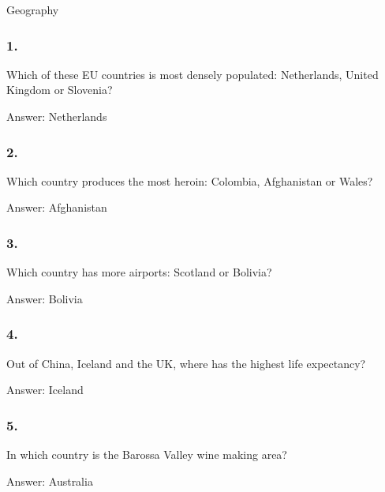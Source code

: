 \documentclass{beamer}
\begin{document}
    \begin{frame}
        \begin{center}
            \Huge Geography
        \end{center}
    \end{frame}

    \begin{frame}
        \frametitle{1.}
        Which of these EU countries is most densely populated: Netherlands,
        United Kingdom or Slovenia?\\

        \begin{center}
            Answer: Netherlands
        \end{center}
    \end{frame}

    \begin{frame}
        \frametitle{2.}
        Which country produces the most heroin: Colombia, Afghanistan or
        Wales?\\

        \begin{center}
            Answer: Afghanistan
        \end{center}
    \end{frame}

    \begin{frame}
        \frametitle{3.}
        Which country has more airports: Scotland or Bolivia?\\

        \begin{center}
            Answer: Bolivia
        \end{center}
    \end{frame}

    \begin{frame}
        \frametitle{4.}
        Out of China, Iceland and the UK, where has the highest life
        expectancy?\\

        \begin{center}
            Answer: Iceland
        \end{center}
    \end{frame}

    \begin{frame}
        \frametitle{5.}
        In which country is the Barossa Valley wine making area?\\

        \begin{center}
            Answer: Australia
        \end{center}
    \end{frame}
\end{document}
